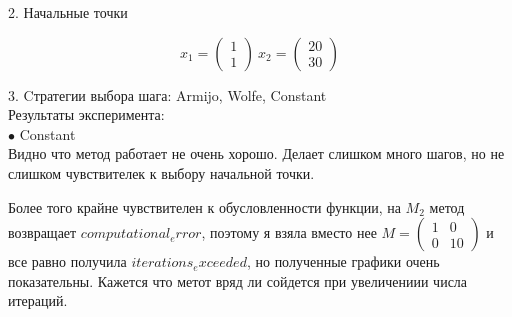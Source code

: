 \documentclass{article}
\theoremstyle{definition}
\theoremstyle{remark}
\begin{document}
2. Начальные точки

$$
x_1 =
\begin{pmatrix}
1 \\
1
\end{pmatrix}\ x_2 =
\begin{pmatrix}
20 \\
30
\end{pmatrix}
$$

3. Cтратегии выбора шага: Armijo, Wolfe, Constant\\


Результаты эксперимента:\\


$\bullet$ Constant\\

Видно что метод работает не очень хорошо. Делает слишком много шагов, но не слишком чувствителек к выбору начальной точки.

Более того крайне чувствителен к обусловленности функции, на $M_2$ метод возвращает $computational_error$, поэтому я взяла вместо нее
$
M =\begin{pmatrix}1 &	0\\ 0 &	10
\end{pmatrix}
$
и все равно получила $iterations_exceeded$, но полученные графики очень показательны. Кажется что метот вряд ли сойдется при увеличениии числа итераций.
\end{document}

